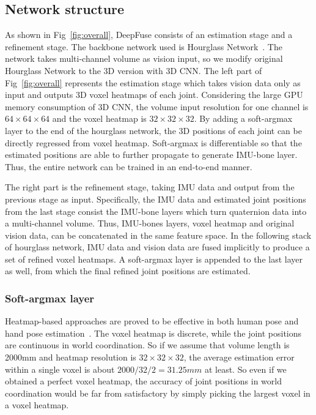 \documentclass[10pt,twocolumn,letterpaper]{article}
\begin{document}
\subsection{Network structure}
As shown in Fig~\ref{fig:overall}, DeepFuse consists of an estimation stage and a refinement stage. The backbone network used is Hourglass Network~\cite{newell2016stacked}. The network takes multi-channel volume as vision input, so we modify original Hourglass Network to the 3D version with 3D CNN. The left part of Fig~\ref{fig:overall} represents the estimation stage which takes vision data only as input and outputs 3D voxel heatmaps of each joint. Considering the large GPU memory consumption of 3D CNN, the volume input resolution for one channel is $64\times64\times64$ and the voxel heatmap is $32\times32\times32$. By adding a soft-argmax layer to the end of the hourglass network, the 3D positions of each joint can be directly regressed from voxel heatmap. Soft-argmax is differentiable so that the estimated positions are able to further propagate to generate IMU-bone layer. Thus, the entire network can be trained in an end-to-end manner.

The right part is the refinement stage, taking IMU data and output from the previous stage as input. Specifically, the IMU data and estimated joint positions from the last stage consist the IMU-bone layers which turn quaternion data into a multi-channel volume. Thus, IMU-bones layers, voxel heatmap and original vision data, can be concatenated in the same feature space. In the following stack of hourglass network, IMU data and vision data are fused implicitly to produce a set of refined voxel heatmaps. A soft-argmax layer is appended to the last layer as well, from which the final refined joint positions are estimated.  
\vspace{-0.4cm}
\subsubsection{Soft-argmax layer }
\label{sec:sal}
Heatmap-based approaches are proved to be effective in both human pose and hand pose estimation~\cite{newell2016stacked,huang2018}. The voxel heatmap is discrete, while the joint positions are continuous in world coordination. So if we assume that volume length is 2000mm and heatmap resolution is $32\times32\times32$, the average estimation error within a single voxel is about $2000/32/2=31.25mm$ at least. So even if we obtained a perfect voxel heatmap, the accuracy of joint positions in world coordination would be far from satisfactory by simply picking the largest voxel in a voxel heatmap. 
\end{document}

